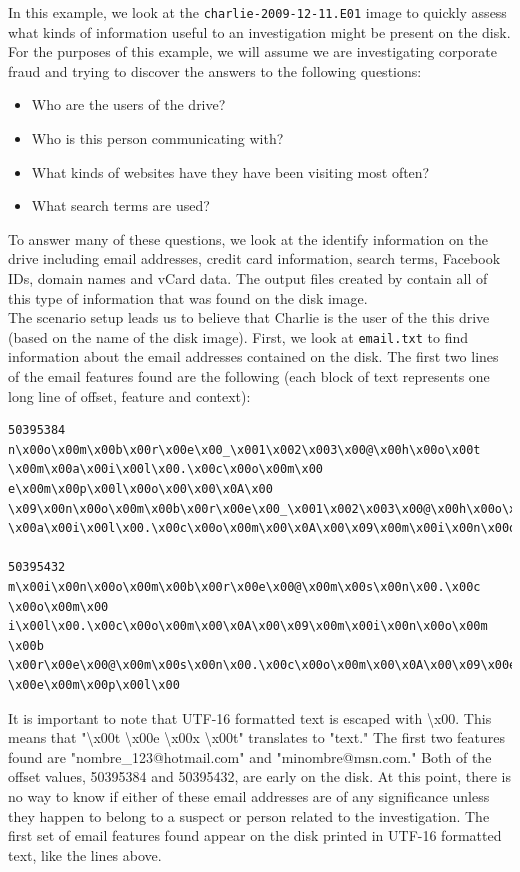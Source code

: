 In this example, we look at the \texttt{charlie-2009-12-11.E01} image to quickly assess what kinds of information useful to an investigation might be present on the disk. For the purposes of this example, we will assume we are investigating corporate fraud and trying to discover the answers to the following questions:
\begin{itemize}
\item Who are the users of the drive?
\item Who is this person communicating with?
\item What kinds of websites have they have been visiting most often?
\item What search terms are used?
\end{itemize}

To answer many of these questions, we look at the identify information on the drive including email addresses, credit card information, search terms, Facebook IDs, domain names and vCard data. The output files created by \bulk contain all of this type of information that was found on the disk image. \\

The scenario setup leads us to believe that Charlie is the user of the this drive (based on the name of the disk image). First, we look at \texttt{email.txt} to find information about the email addresses contained on the disk. The first two lines of the email features found are the following (each block of text represents one long line of offset, feature and context):
\lstset{style=customfile}
\begin{lstlisting}
50395384	n\x00o\x00m\x00b\x00r\x00e\x00_\x001\x002\x003\x00@\x00h\x00o\x00t
\x00m\x00a\x00i\x00l\x00.\x00c\x00o\x00m\x00    e\x00m\x00p\x00l\x00o\x00\x00\x0A\x00
\x09\x00n\x00o\x00m\x00b\x00r\x00e\x00_\x001\x002\x003\x00@\x00h\x00o\x00t\x00m
\x00a\x00i\x00l\x00.\x00c\x00o\x00m\x00\x0A\x00\x09\x00m\x00i\x00n\x00o\x00m\x00b\x00

50395432	m\x00i\x00n\x00o\x00m\x00b\x00r\x00e\x00@\x00m\x00s\x00n\x00.\x00c
\x00o\x00m\x00	i\x00l\x00.\x00c\x00o\x00m\x00\x0A\x00\x09\x00m\x00i\x00n\x00o\x00m
\x00b \x00r\x00e\x00@\x00m\x00s\x00n\x00.\x00c\x00o\x00m\x00\x0A\x00\x09\x00e\x00j
\x00e\x00m\x00p\x00l\x00
\end{lstlisting}

It is important to note that UTF-16 formatted text is escaped with \textbackslash x00. This means that "\textbackslash x00t \textbackslash x00e \textbackslash x00x \textbackslash x00t" translates to "text." The first two features found are "nombre\_123@hotmail.com" and "minombre@msn.com."  Both of the offset values, 50395384 and 50395432, are early on the disk. At this point, there is no way to know if either of these email addresses are of any significance unless they happen to belong to a suspect or person related to the investigation. The first set of email features found appear on the disk printed in UTF-16 formatted text, like the lines above.\\

